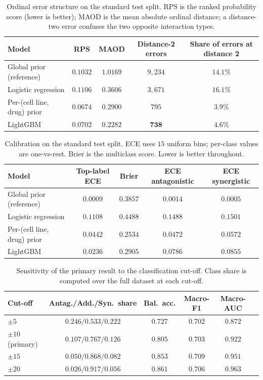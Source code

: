 \documentclass{bmcart}
\begin{document}
\begin{backmatter}
\begin{table}[h!]
\caption{Ordinal error structure on the standard test split. RPS is the ranked probability score
(lower is better); MAOD is the mean absolute ordinal distance; a distance-two error confuses the two
opposite interaction types.}
\label{tab:ordinal}
\begin{tabular}{lcccc}
\toprule
Model & RPS & MAOD & Distance-2 errors & Share of errors at distance 2 \\
\midrule
Global prior (reference)      & $0.1032$ & $1.0169$ & $9{,}234$ & $14.1\%$ \\
Logistic regression           & $0.1106$ & $0.3606$ & $3{,}671$ & $16.1\%$ \\
Per-(cell line, drug) prior   & $\mathbf{0.0674}$ & $0.2900$ & $795$ & $\mathbf{3.9\%}$ \\
LightGBM                      & $0.0702$ & $\mathbf{0.2282}$ & $\mathbf{738}$ & $4.6\%$ \\
\bottomrule
\end{tabular}
\end{table}

\begin{table}[h!]
\caption{Calibration on the standard test split. ECE uses $15$ uniform bins; per-class values are
one-vs-rest. Brier is the multiclass score. Lower is better throughout.}
\label{tab:calib}
\begin{tabular}{lcccc}
\toprule
Model & Top-label ECE & Brier & ECE antagonistic & ECE synergistic \\
\midrule
Global prior (reference)     & $0.0009$ & $0.3857$ & $0.0014$ & $0.0005$ \\
Logistic regression          & $0.1108$ & $0.4488$ & $0.1488$ & $0.1501$ \\
Per-(cell line, drug) prior  & $0.0442$ & $\mathbf{0.2534}$ & $0.0472$ & $0.0572$ \\
LightGBM                     & $\mathbf{0.0236}$ & $0.2905$ & $0.0786$ & $0.0855$ \\
\bottomrule
\end{tabular}
\end{table}

\begin{table}[h!]
\caption{Sensitivity of the primary result to the classification cut-off. Class share is computed over
the full dataset at each cut-off.}
\label{tab:threshold}
\begin{tabular}{lccccc}
\toprule
Cut-off & Antag./Add./Syn.\ share & Bal.\ acc. & Macro-F1 & Macro-AUC \\
\midrule
$\pm 5$                & $0.246 / 0.533 / 0.222$ & $0.727$ & $0.702$ & $0.872$ \\
$\pm 10$ (primary)     & $0.107 / 0.767 / 0.126$ & $0.805$ & $0.703$ & $0.922$ \\
$\pm 15$               & $0.050 / 0.868 / 0.082$ & $0.853$ & $0.709$ & $0.951$ \\
$\pm 20$               & $0.026 / 0.917 / 0.056$ & $0.861$ & $0.706$ & $0.963$ \\
\bottomrule
\end{tabular}
\end{table}


\end{backmatter}
\end{document}
